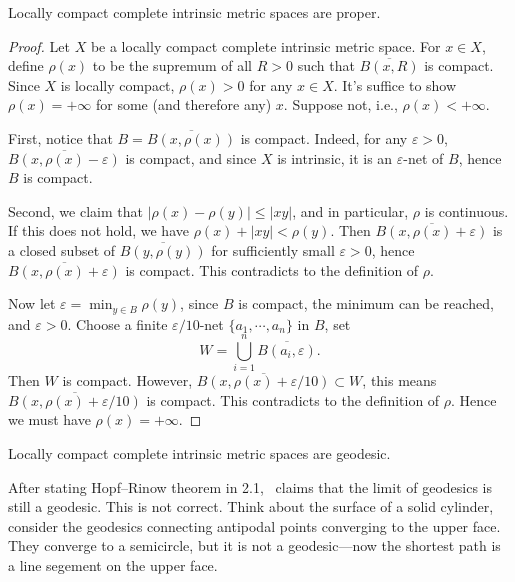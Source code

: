\begin{thm}
    Locally compact complete intrinsic metric spaces are proper.
\end{thm}
\begin{proof}
    Let $X$ be a locally compact complete intrinsic metric space.
    For $x\in X$, define $\rho(x)$ to be the supremum of all $R>0$ such that $\overline{B(x,R)}$ is compact.
    Since $X$ is locally compact, $\rho(x)>0$ for any $x\in X$.
    It's suffice to show $\rho(x)=+\infty$ for some (and therefore any) $x$.
    Suppose not, i.e., $\rho(x)<+\infty$.

    First, notice that $B=\overline{B(x,\rho(x))}$ is compact.
    Indeed, for any $\varepsilon>0$, $\overline{B(x,\rho(x)-\varepsilon)}$ is compact, and since $X$ is intrinsic, it is an $\varepsilon$-net of $B$, hence $B$ is compact.

    Second, we claim that $|\rho(x)-\rho(y)|\leq|xy|$, and in particular, $\rho$ is continuous.
    If this does not hold, we have $\rho(x)+|xy|<\rho(y)$.
    Then $\overline{B(x,\rho(x)+\varepsilon)}$ is a closed subset of $\overline{B(y,\rho(y))}$ for sufficiently small $\varepsilon>0$, hence $\overline{B(x,\rho(x)+\varepsilon)}$ is compact.
    This contradicts to the definition of $\rho$.

    Now let $\varepsilon=\min_{y\in B}\rho(y)$, since $B$ is compact, the minimum can be reached, and $\varepsilon>0$.
    Choose a finite $\varepsilon/10$-net $\{a_1,\cdots,a_n\}$ in $B$, set
    \[W=\bigcup_{i=1}^n\overline{B(a_i,\varepsilon)}.\]
    Then $W$ is compact.
    However, $\overline{B(x,\rho(x)+\varepsilon/10)}\subset W$, this means $\overline{B(x,\rho(x)+\varepsilon/10)}$ is compact.
    This contradicts to the definition of $\rho$.
    Hence we must have $\rho(x)=+\infty$.
\end{proof}

\begin{cor}
    Locally compact complete intrinsic metric spaces are geodesic.
\end{cor}

\begin{rem}
    After stating Hopf--Rinow theorem in 2.1, \cite{buragoADAlexandrovSpaces1992}~claims that the limit of geodesics is still a geodesic.
    This is not correct.
    Think about the surface of a solid cylinder, consider the geodesics connecting antipodal points converging to the upper face.
    They converge to a semicircle, but it is not a geodesic---now the shortest path is a line segement on the upper face.
\end{rem}

